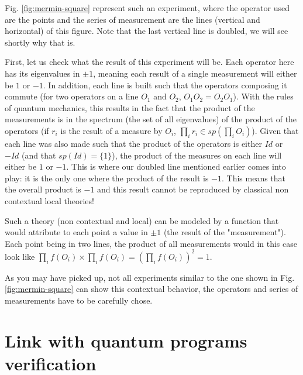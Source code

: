\documentclass{article}
\begin{document}
Fig. \ref{fig:mermin-square} represent such an experiment, where the operator
used are the points and the series of measurement are the lines (vertical and
horizontal) of this figure. Note that the last vertical line is doubled, we will
see shortly why that is.

First, let us check what the result of this experiment will be. Each operator
here has its eigenvalues in $\pm1$, meaning each result of a single measurement
will either be $1$ or $-1$. In addition, each line is built such that the
operators composing it commute (for two operators on a line $O_1$ and $O_2$,
$O_1O_2=O_2O_1$). With the rules of quantum mechanics, this results in the
fact that the product of the measurements is in the spectrum (the set of all
eigenvalues) of the product of the operators (if $r_i$ is the result of a
measure by $O_i$, $\prod_i r_i \in sp(\prod_i O_i)$). Given that each line was
also made such that the product of the operators is either $Id$ or $-Id$ (and
that $sp(Id)=\{1\}$), the product of the measures on each line will either be $1$
or $-1$. This is where our doubled line mentioned earlier comes into play: it is
the only one where the product of the result is $-1$. This means that the overall
product is $-1$ and this result cannot be reproduced by classical non contextual
local theories!

Such a theory (non contextual and local) can be modeled by a function that would
attribute to each point a value in $\pm1$ (the result of the "measurement"). Each
point being in two lines, the product of all measurements would in this case look
like $\prod_i f(O_i) \times \prod_i f(O_i) = (\prod_i f(O_i))^2 = 1$.

As you may have picked up, not all experiments similar to the one shown in Fig.
\ref{fig:mermin-square} can show this contextual behavior, the operators and
series of measurements have to be carefully chose.

\section{Link with quantum programs verification}
\label{sec:link_with_quantum_programs_verification}
\end{document}
